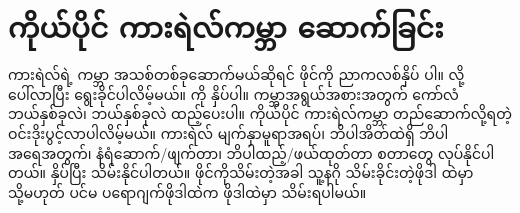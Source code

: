 \clearpage

\section*{ကိုယ်ပိုင် ကားရဲလ်ကမ္ဘာ ဆောက်ခြင်း }
ကားရဲလ်ရဲ့ ကမ္ဘာ အသစ်တစ်ခုဆောက်မယ်ဆိုရင်  ဖိုင်ကို ညာကလစ်နှိပ်   ပါ။  လို့ ပေါ်လာပြီး  ရွေးခိုင်ပါလိမ့်မယ်။  ကို နှိပ်ပါ။ ကမ္ဘာအရွယ်အစားအတွက် ကော်လံ ဘယ်နှစ်ခုလဲ၊  ဘယ်နှစ်ခုလဲ ထည့်ပေးပါ။  ကိုယ်ပိုင် ကားရဲလ်ကမ္ဘာ တည်ဆောက်လို့ရတဲ့ ဝင်းဒိုးပွင့်လာပါလိမ့်မယ်။ ကားရဲလ် မျက်နှာမူရာအရပ်၊ ဘိပါအိတ်ထဲရှိ ဘိပါအရေအတွက်၊ နံရံဆောက်/ဖျက်တာ၊ ဘိပါထည့်/ဖယ်ထုတ်တာ စတာတွေ လုပ်နိုင်ပါတယ်။   နှိပ်ပြီး သိမ်းနိုင်ပါတယ်။ ဖိုင်ကိုသိမ်းတဲ့အခါ သူ့နဂို သိမ်းခိုင်းတဲ့ဖိုဒါ  ထဲမှာ သို့မဟုတ် ပင်မ ပရောဂျက်ဖိုဒါထဲက  ဖိုဒါထဲမှာ သိမ်းရပါမယ်။  

\begin{figure}[tbh!]
\caption{} 
\label{fig:default_worlds}
\end{figure}

\begin{figure}[tbh!]
\caption{} 
\label{fig:proj_worlds}
\end{figure}


